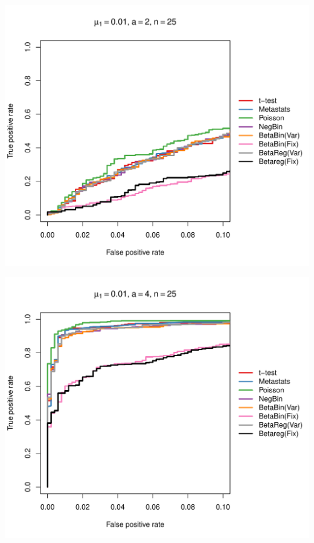 \documentclass[12pt]{article}\usepackage{graphicx, color}
\makeatletter
\def\maxwidth{ %
  \ifdim\Gin@nat@width>\linewidth
    \linewidth
  \else
    \Gin@nat@width
  \fi
}
\newenvironment{knitrout}{}{} %
\makeatother
\begin{document}
\begin{knitrout}
{\centering \includegraphics[width=\maxwidth]{figure/rocs35} 

}




{\centering \includegraphics[width=\maxwidth]{figure/rocs36} 

}





\end{knitrout}
\end{document}
